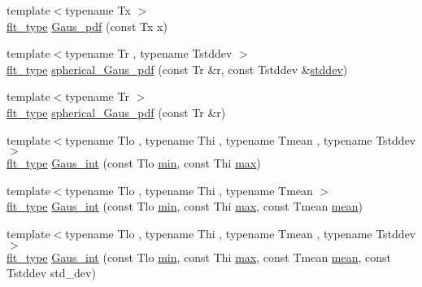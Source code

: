 \begin{DoxyCompactItemize}
\item 
{\footnotesize template$<$typename Tx $>$ }\\\hyperlink{lib_2IceBRG__main_2common_8h_ad0f130a56eeb944d9ef2692ee881ecc4}{flt\-\_\-type} \hyperlink{namespaceIceBRG_a50467489e498f200633a8b6a61463128}{Gaus\-\_\-pdf} (const Tx x)
\item 
{\footnotesize template$<$typename Tr , typename Tstddev $>$ }\\\hyperlink{lib_2IceBRG__main_2common_8h_ad0f130a56eeb944d9ef2692ee881ecc4}{flt\-\_\-type} \hyperlink{namespaceIceBRG_a86dea37686c1770a3a8aaab374cc3687}{spherical\-\_\-\-Gaus\-\_\-pdf} (const Tr \&r, const Tstddev \&\hyperlink{namespaceIceBRG_a9db49a32658ae04d4e5780e90c58ae15}{stddev})
\item 
{\footnotesize template$<$typename Tr $>$ }\\\hyperlink{lib_2IceBRG__main_2common_8h_ad0f130a56eeb944d9ef2692ee881ecc4}{flt\-\_\-type} \hyperlink{namespaceIceBRG_a4f04b3480baf1f252d04f7f1c4777a7d}{spherical\-\_\-\-Gaus\-\_\-pdf} (const Tr \&r)
\item 
{\footnotesize template$<$typename Tlo , typename Thi , typename Tmean , typename Tstddev $>$ }\\\hyperlink{lib_2IceBRG__main_2common_8h_ad0f130a56eeb944d9ef2692ee881ecc4}{flt\-\_\-type} \hyperlink{namespaceIceBRG_a22ce04cc01b33b6d2b6de4125456bd34}{Gaus\-\_\-int} (const Tlo \hyperlink{namespaceIceBRG_ad79c6bf9877e0d543cf61a479754e4b6}{min}, const Thi \hyperlink{namespaceIceBRG_a095a1ee68bf6116d22d2e23a2b8bfb9d}{max})
\item 
{\footnotesize template$<$typename Tlo , typename Thi , typename Tmean $>$ }\\\hyperlink{lib_2IceBRG__main_2common_8h_ad0f130a56eeb944d9ef2692ee881ecc4}{flt\-\_\-type} \hyperlink{namespaceIceBRG_a2056e0efcbeb941094f619adebc2a375}{Gaus\-\_\-int} (const Tlo \hyperlink{namespaceIceBRG_ad79c6bf9877e0d543cf61a479754e4b6}{min}, const Thi \hyperlink{namespaceIceBRG_a095a1ee68bf6116d22d2e23a2b8bfb9d}{max}, const Tmean \hyperlink{namespaceIceBRG_a31912d66a78938bcc3e0fdbc917c5eec}{mean})
\item 
{\footnotesize template$<$typename Tlo , typename Thi , typename Tmean , typename Tstddev $>$ }\\\hyperlink{lib_2IceBRG__main_2common_8h_ad0f130a56eeb944d9ef2692ee881ecc4}{flt\-\_\-type} \hyperlink{namespaceIceBRG_ace47a01b4a92f314bca2201efd67ede9}{Gaus\-\_\-int} (const Tlo \hyperlink{namespaceIceBRG_ad79c6bf9877e0d543cf61a479754e4b6}{min}, const Thi \hyperlink{namespaceIceBRG_a095a1ee68bf6116d22d2e23a2b8bfb9d}{max}, const Tmean \hyperlink{namespaceIceBRG_a31912d66a78938bcc3e0fdbc917c5eec}{mean}, const Tstddev std\-\_\-dev)

\end{DoxyCompactItemize}
